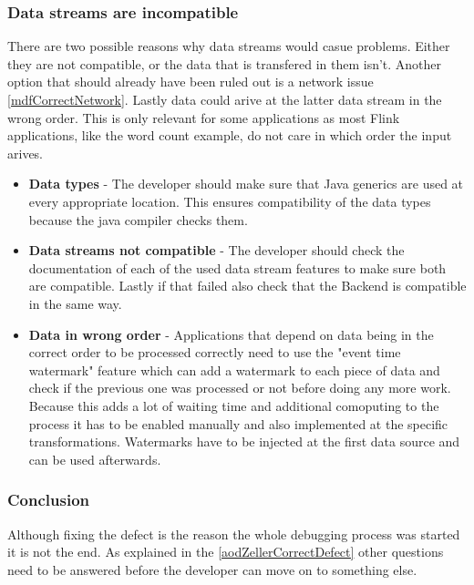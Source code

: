 \subsubsection{Data streams are incompatible}
\label{mdfCorrectDataStreams}
There are two possible reasons why data streams would casue problems. Either they are not compatible, or the data that is transfered in them isn't. Another option that should already have been ruled out is a network issue \ref{mdfCorrectNetwork}. Lastly data could arive at the latter data stream in the wrong order. This is only relevant for some applications as most Flink applications, like the word count example, do not care in which order the input arives.
\begin{itemize}
  \item \textbf{Data types} - The developer should make sure that Java generics are used at every appropriate location. This ensures compatibility of the data types because the java compiler checks them.
  \item \textbf{Data streams not compatible} - The developer should check the documentation of each of the used data stream features to make sure both are compatible. Lastly if that failed also check that the Backend is compatible in the same way.
  \item \textbf{Data in wrong order} - Applications that depend on data being in the correct order to be processed correctly need to use the "event time watermark" feature which can add a watermark to each piece of data and check if the previous one was processed or not before doing any more work. Because this adds a lot of waiting time and additional comoputing to the process it has to be enabled manually and also implemented at the specific transformations. Watermarks have to be injected at the first data source and can be used afterwards.
\end{itemize}

\subsubsection{Conclusion}
Although fixing the defect is the reason the whole debugging process was started it is not the end. As explained in the \ref{aodZellerCorrectDefect} other questions need to be answered before the developer can move on to something else.

